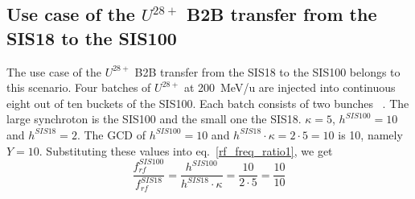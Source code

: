 
\subsection{Use case of the $U^{28+}$ B2B transfer from the SIS18 to the SIS100}
\label{sec:cir_no_int}
The use case of the $U^{28+}$ B2B transfer from the SIS18 to the SIS100 belongs to this scenario. Four batches of $U^{28+}$ at \SI{200}{MeV/\atomicmassunit} are injected into continuous eight out of ten buckets of the SIS100. Each batch consists of two bunches ~\cite{liebermann_fair_2013, liebermann_sis100_2013}. The large synchroton is the SIS100 and the small one the SIS18. $\kappa=5$, $h^{\mathit{SIS100}}=10$ and $h^{\mathit{SIS18}}=2$. %
The GCD of $h^{\mathit{SIS100}}=10$ and $h^{\mathit{SIS18}} \cdot \kappa=2\cdot 5=10$ is 10, namely $Y=10$. Substituting these values into eq.~\ref{rf_freq_ratio1}, we get
\begin{equation}
\frac{f_{\mathit{rf}}^{\mathit{SIS100}}}{f_{\mathit{rf}}^{\mathit{SIS18}}}= \frac {h^{\mathit{SIS100}}}{h^{\mathit{SIS18}} \cdot \kappa}= \frac{10}{2 \cdot 5}=\frac{10}{10}
\end{equation}


